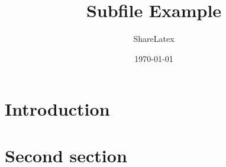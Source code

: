 \documentclass{article}
\title{Subfile Example}
\author{ShareLatex}
\date{\today}
\begin{document}
 
\maketitle
 
\section{Introduction}
    
 
\section{Second section}
    
 
\end{document}
